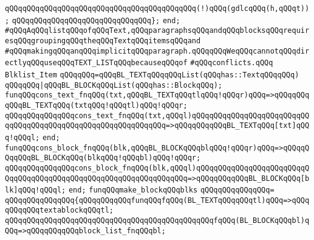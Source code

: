 \verb|qQQqqQQqqQQqqQQqqQQqqQQqqQQqqQQqqQQqqQQqqQQq(!)qQQq(gdlcqQQq(h,qQQqt));|\newline
\verb|qQQqqQQqqQQqqQQqqQQqqQQqqQQqqQQq};|\newline
\verb|end;|\newline
\newline
\verb|#qQQqAqQQqlistqQQqofqQQqText,qQQqparagraphsqQQqandqQQqblocksqQQqrequiresqQQqgroupingqQQqtheqQQqTextqQQqitemsqQQqand|\newline
\verb|#qQQqmakingqQQqanqQQqimplicitqQQqparagraph.qQQqqQQqWeqQQqcannotqQQqdirectlyqQQquseqQQqTEXT_LISTqQQqbecauseqQQqof|\newline
\verb|#qQQqconflicts.qQQq|\newline
\newline
\newline
\verb|Blklist_Item|\newline
\verb|qQQqqQQq=qQQqBL_TEXTqQQqqQQqList(qQQqhas::TextqQQqqQQq)|\newline
\verb|qQQqqQQq|\verb#|qQQqBL_BLOCKqQQqList(qQQqhas::BlockqQQq);#\newline
\newline
\verb|funqQQqcons_text_fnqQQq(txt,qQQqBL_TEXTqQQqtlqQQq!qQQqr)qQQq=>qQQqqQQqqQQqBL_TEXTqQQq(txtqQQq!qQQqtl)qQQq!qQQqr;|\newline
\verb|qQQqqQQqqQQqqQQqcons_text_fnqQQq(txt,qQQql)qQQqqQQqqQQqqQQqqQQqqQQqqQQqqQQqqQQqqQQqqQQqqQQqqQQqqQQqqQQqqQQq=>qQQqqQQqqQQqBL_TEXTqQQq[txt]qQQq!qQQql;|\newline
\verb|end;|\newline
\newline
\verb|funqQQqcons_block_fnqQQq(blk,qQQqBL_BLOCKqQQqblqQQq!qQQqr)qQQq=>qQQqqQQqqQQqBL_BLOCKqQQq(blkqQQq!qQQqbl)qQQq!qQQqr;|\newline
\verb|qQQqqQQqqQQqqQQqcons_block_fnqQQq(blk,qQQql)qQQqqQQqqQQqqQQqqQQqqQQqqQQqqQQqqQQqqQQqqQQqqQQqqQQqqQQqqQQqqQQqqQQq=>qQQqqQQqqQQqBL_BLOCKqQQq[blk]qQQq!qQQql;|\newline
\verb|end;|\newline
\newline
\verb|funqQQqmake_blockqQQqblks|\newline
\verb|qQQqqQQqqQQqqQQq=|\newline
\verb|qQQqqQQqqQQqqQQq{qQQqqQQqqQQqfunqQQqfqQQq(BL_TEXTqQQqqQQqtl)qQQq=>qQQqqQQqqQQqtextablockqQQqtl;|\newline
\verb|qQQqqQQqqQQqqQQqqQQqqQQqqQQqqQQqqQQqqQQqqQQqqQQqfqQQq(BL_BLOCKqQQqbl)qQQq=>qQQqqQQqqQQqblock_list_fnqQQqbl;|\newline
